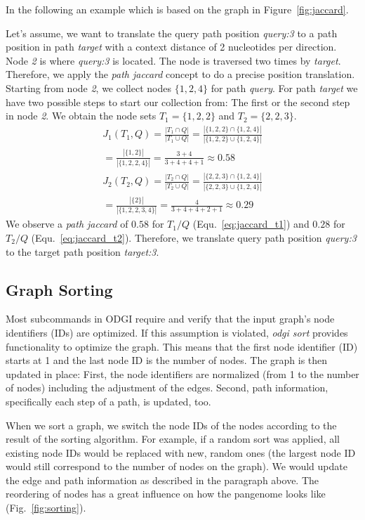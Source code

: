 \documentclass{bioinfo}
\begin{document}
In the following an example which is based on the graph in Figure~\ref{fig:jaccard}.

Let's assume, we want to translate the query path position \textit{query:3} to a path position in path \textit{target} with a context distance of 2 nucleotides per direction. Node \textit{2} is where \textit{query:3} is located. The node is traversed two times by \textit{target}. Therefore, we apply the \textit{path jaccard} concept to do a precise position translation. Starting from node \textit{2}, we collect nodes $\{1,2,4\}$ for path \textit{query}. For path \textit{target} we have two possible steps to start our collection from: The first or the second step in node \textit{2}. We obtain the node sets $T_1=\{1,2,2\}$ and $T_2=\{2,2,3\}$.
\begin{multline}
	J_1(T_1,Q)=\frac{|T_1\cap Q|}{|T_1\cup Q|}=\frac{|\{1,2,2\}\cap \{1,2,4\}|}{|\{1,2,2\}\cup \{1,2,4\}|}\\=\frac{|\{1,2\}|}{|\{1,2,2,4\}|}=\frac{3+4}{3+4+4+1}\approx0.58
	\label{eq:jaccard_t1}
\end{multline}
\begin{multline}
	J_2(T_2,Q)=\frac{|T_2\cap Q|}{|T_2\cup Q|}=\frac{|\{2,2,3\}\cap \{1,2,4\}|}{|\{2,2,3\}\cup \{1,2,4\}|}\\=\frac{|\{2\}|}{|\{1,2,2,3,4\}|}=\frac{4}{3+4+4+2+1}\approx0.29
	\label{eq:jaccard_t2}
\end{multline}
We observe a \textit{path jaccard} of $0.58$ for $T_1/Q$ (Equ.~\ref{eq:jaccard_t1}) and $0.28$ for $T_2/Q$ (Equ.~\ref{eq:jaccard_t2}).
Therefore, we translate query path position \textit{query:3} to the target path position \textit{target:3}.

\subsection{Graph Sorting}
Most subcommands in ODGI require and verify that the input graph’s node identifiers (IDs) are optimized. If this assumption is violated, \textit{odgi sort} provides functionality to optimize the graph. This means that the first node identifier (ID) starts at 1 and the last node ID is the number of nodes. The graph is then updated in place: First, the node identifiers are normalized (from 1 to the number of nodes) including the adjustment of the edges. Second, path information, specifically each step of a path, is updated, too.

When we sort a graph, we switch the node IDs of the nodes according to the result of the sorting algorithm. For example, if a random sort was applied, all existing node IDs would be replaced with new, random ones (the largest node ID would still correspond to the number of nodes on the graph). We would update the edge and path information as described in the paragraph above. The reordering of nodes has a great influence on how the pangenome looks like (Fig.~\ref{fig:sorting}).
\end{document}
